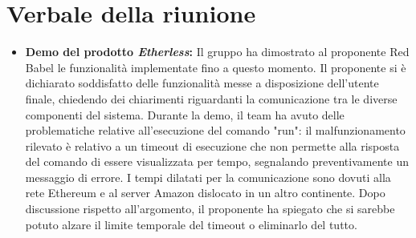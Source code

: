 \section{Verbale della riunione}
	\begin{itemize}
		\item \textbf{Demo del prodotto \textit{Etherless}:}
		Il gruppo ha dimostrato al proponente Red Babel le funzionalità implementate fino a questo momento. Il proponente si è dichiarato soddisfatto delle funzionalità messe a disposizione dell'utente finale, chiedendo dei chiarimenti riguardanti la comunicazione tra le diverse componenti del sistema. Durante la demo, il team ha avuto delle problematiche relative all'esecuzione del comando "run": il malfunzionamento rilevato è relativo a un timeout di esecuzione che non permette alla risposta del comando di essere visualizzata per tempo, segnalando preventivamente un messaggio di errore. I tempi dilatati per la comunicazione sono dovuti alla rete Ethereum e al server Amazon dislocato in un altro continente. Dopo discussione rispetto all'argomento, il proponente ha spiegato che si sarebbe potuto alzare il limite temporale del timeout o eliminarlo del tutto.
	\end{itemize}
